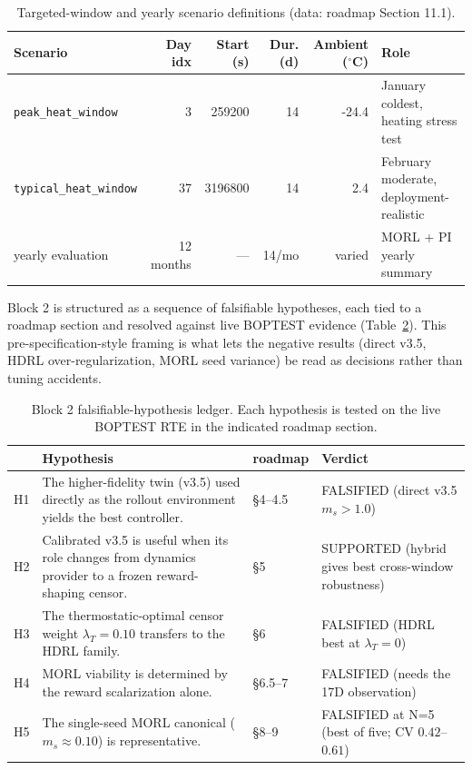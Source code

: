 \documentclass[11pt,a4paper]{article}
\begin{document}
\begin{table}[H]
\centering
\caption{Targeted-window and yearly scenario definitions (data: roadmap Section 11.1).}
\label{tab:scenarios}
\small
\begin{tabular}{lrrrr>{\raggedright\arraybackslash}p{40mm}}
\toprule
Scenario & Day idx & Start (s) & Dur. (d) & Ambient ($^\circ$C) & Role \\
\midrule
\texttt{peak\_heat\_window} & 3 & 259200 & 14 & -24.4 & January coldest, heating stress test \\
\texttt{typical\_heat\_window} & 37 & 3196800 & 14 & 2.4 & February moderate, deployment-realistic \\
yearly evaluation & 12 months & --- & 14/mo & varied & MORL + PI yearly summary \\
\bottomrule
\end{tabular}
\end{table}

Block 2 is structured as a sequence of falsifiable hypotheses, each tied to a roadmap section and resolved against live BOPTEST evidence (Table~\ref{tab:hypotheses}). This pre-specification-style framing is what lets the negative results (direct v3.5, HDRL over-regularization, MORL seed variance) be read as decisions rather than tuning accidents.

\begin{table}[H]
\centering
\caption{Block 2 falsifiable-hypothesis ledger. Each hypothesis is tested on the live BOPTEST RTE in the indicated roadmap section.}
\label{tab:hypotheses}
\small
\begin{tabular}{>{\raggedright\arraybackslash}p{5mm}>{\raggedright\arraybackslash}p{66mm}l>{\raggedright\arraybackslash}p{40mm}}
\toprule
 & Hypothesis & roadmap & Verdict \\
\midrule
H1 & The higher-fidelity twin (v3.5) used directly as the rollout environment yields the best controller. & \S4--4.5 & FALSIFIED (direct v3.5 $m_s>1.0$) \\
H2 & Calibrated v3.5 is useful when its role changes from dynamics provider to a frozen reward-shaping censor. & \S5 & SUPPORTED (hybrid gives best cross-window robustness) \\
H3 & The thermostatic-optimal censor weight $\lambda_T=0.10$ transfers to the HDRL family. & \S6 & FALSIFIED (HDRL best at $\lambda_T=0$) \\
H4 & MORL viability is determined by the reward scalarization alone. & \S6.5--7 & FALSIFIED (needs the 17D observation) \\
H5 & The single-seed MORL canonical ($m_s\approx0.10$) is representative. & \S8--9 & FALSIFIED at N=5 (best of five; CV $0.42$--$0.61$) \\
\bottomrule
\end{tabular}
\end{table}
\end{document}

